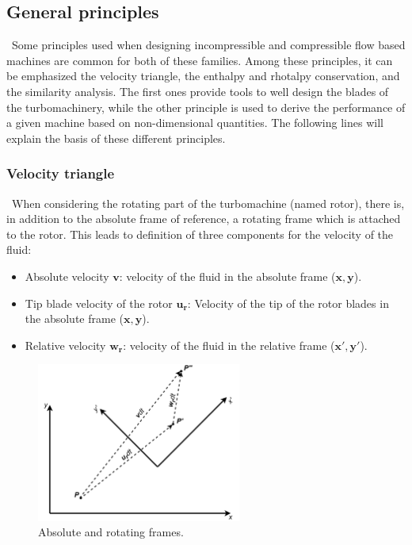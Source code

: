 \subsection{General principles}
\quad\ Some principles used when designing incompressible and compressible flow based machines are common for both of these families. Among these principles, it can be emphasized the velocity triangle, the enthalpy and rhotalpy conservation, and the similarity analysis. The first ones provide tools to well design the blades of the turbomachinery, while the other principle is used to derive the performance of a given machine based on non-dimensional quantities. The following lines will explain the basis of these different principles. 

\subsubsection{Velocity triangle}
\quad\ When considering the rotating part of the turbomachine (named rotor), there is, in addition to the absolute frame of reference, a rotating frame which is attached to the rotor. This leads to definition of three components for the velocity of the fluid: 

\begin{itemize}
    \item Absolute velocity \(\mathbf{v}\): velocity of the fluid in the absolute frame (\(\mathbf{x},\mathbf{y}\)).
    \item Tip blade velocity of the rotor \(\mathbf{u_r}\): Velocity of the tip of the rotor blades in the absolute frame (\(\mathbf{x},\mathbf{y}\)).
    \item Relative velocity \(\mathbf{w_r}\): velocity of the fluid in the relative frame  (\(\mathbf{x'},\mathbf{y'}\)).
\end{itemize}

\begin{figure}[h]
    \centering
    \includegraphics[width=0.6\textwidth]{Frames.png}
    \caption{Absolute and rotating frames.}
    \label{fig:C4_frames}
\end{figure}

